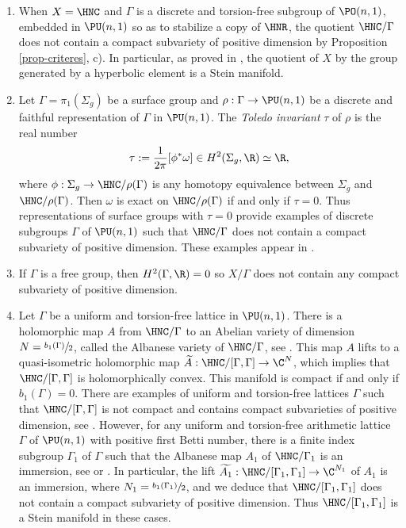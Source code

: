 \skpt
\begin{examples}
\begin{enumerate}
\item When $X=\HNC$ and $\Gamma$ is a discrete and torsion-free subgroup of $\PO(n,1)$, embedded in $\PU(n,1)$ so as to stabilize a copy of $\HNR$, the quotient $\HNC/\Gamma$ does not contain a compact subvariety of positive dimension by Proposition \ref{prop-criteres}, c). In particular, as proved in \cite{chenDiscreteGroupsHolomorphic2013}, the quotient of $X$ by the group generated by a hyperbolic element is a Stein manifold.
\item Let $\Gamma=\pi_1(\Sigma_g)$ be a surface group and $\rho:\Gamma \to \PU(n,1)$ be a discrete and faithful representation of $\Gamma$ in $\PU(n,1)$. The \textit{Toledo invariant} $\tau$ of $\rho$ is the real number
\begin{equation*}
\tau:= \frac{1}{2\pi}[\phi^{*}\omega] \in H^{2}(\Sigma_g,\R) \simeq \R,
\end{equation*}
where $\phi: \Sigma_g \to \HNC/\rho(\Gamma)$ is any homotopy equivalence between $\Sigma_g$ and $\HNC/\rho(\Gamma)$. Then $\omega$ is exact on $\HNC/\rho(\Gamma)$ if and only if $\tau=0$. Thus representations of surface groups with $\tau=0$ provide examples of discrete subgroups $\Gamma$ of $\PU(n,1)$ such that $\HNC/\Gamma$ does not contain a compact subvariety of positive dimension. These examples appear in \cite[p.\,27]{kapovichSurveyComplexHyperbolic2022}.
\item If $\Gamma$ is a free group, then $H^{2}(\Gamma,\R)=0$ so $X/\Gamma$ does not contain any compact subvariety of positive dimension.
\item Let $\Gamma$ be a uniform and torsion-free lattice in $\PU(n,1)$. There is a holomorphic map $A$ from $\HNC/\Gamma$ to an Abelian variety of dimension $N=\sfrac{b_1(\Gamma)}{2}$, called the Albanese variety of $\HNC/\Gamma$, see \cite[Ch.\,12]{voisinTheorieHodgeGeometrie2002}. This map $A$ lifts to a quasi-isometric holomorphic map $\widetilde{A}: \HNC/[\Gamma,\Gamma] \to \C^{N}$, which implies that $\HNC/[\Gamma,\Gamma]$ is holomorphically convex. This manifold is compact if and only if $b_1(\Gamma)=0$. There are examples of uniform and torsion-free lattices $\Gamma$ such that $\HNC/[\Gamma,\Gamma]$ is not compact and contains compact subvarieties of positive dimension, see \cite{cartwrightCartwrightStegerSurface2017}. However, for any uniform and torsion-free arithmetic lattice $\Gamma$ of $\PU(n,1)$ with positive first Betti number, there is a finite index subgroup $\Gamma_1$ of $\Gamma$ such that the Albanese map $A_1$ of $\HNC/\Gamma_1$ is an immersion, see \cite[\S 3.1]{llosaisenrichSubgroupsHyperbolicGroups2024} or \cite{eyssidieuxOrbifoldKahlerGroups2018}. In particular, the lift $\widetilde{A_1}:\HNC/[\Gamma_1,\Gamma_1] \to \C^{N_1}$ of $A_1$ is an immersion, where $N_1=\sfrac{b_1(\Gamma_1)}{2}$, and we deduce that $\HNC/[\Gamma_1,\Gamma_1]$ does not contain a compact subvariety of positive dimension. Thus $\HNC/[\Gamma_1,\Gamma_1]$ is a Stein manifold in these cases.
\end{enumerate}

\end{examples}

